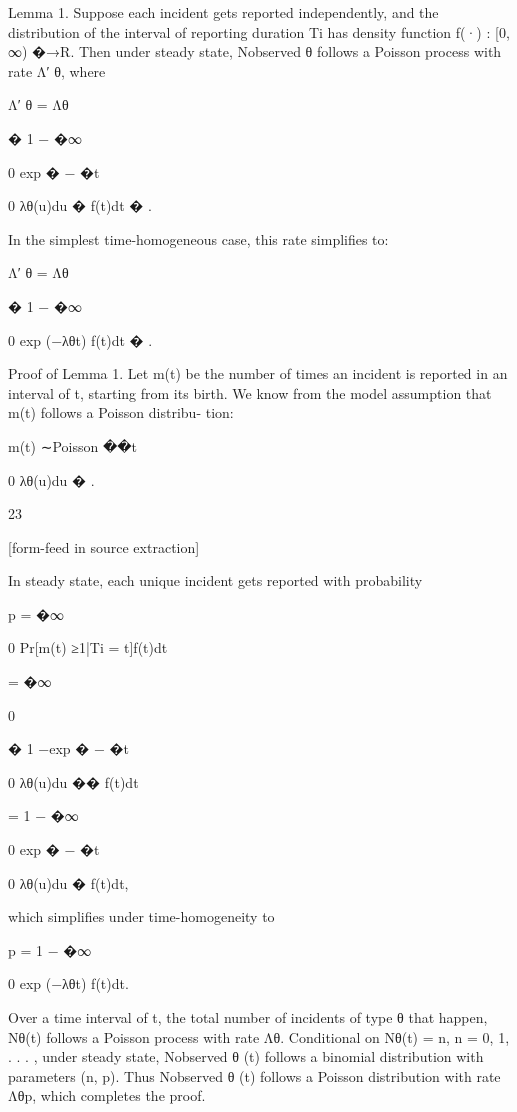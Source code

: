 \documentclass[10pt]{article}
\begin{document}
\begin{ReviewVerbatim}
Lemma 1. Suppose each incident gets reported independently, and the distribution of the interval
of reporting duration Ti has density function f(·) : [0, ∞) �→R. Then under steady state, Nobserved
θ
follows a Poisson process with rate Λ′
θ, where

Λ′
θ = Λθ

�
1 −
�∞

0
exp
�
−
�t

0
λθ(u)du
�
f(t)dt
�
.

In the simplest time-homogeneous case, this rate simplifies to:

Λ′
θ = Λθ

�
1 −
�∞

0
exp (−λθt) f(t)dt
�
.

Proof of Lemma 1. Let m(t) be the number of times an incident is reported in an interval of t,
starting from its birth. We know from the model assumption that m(t) follows a Poisson distribu-
tion:

m(t) ∼Poisson
��t

0
λθ(u)du
�
.

23


[form-feed in source extraction]

In steady state, each unique incident gets reported with probability

p =
�∞

0
Pr[m(t) ≥1|Ti = t]f(t)dt

=
�∞

0

�
1 −exp
�
−
�t

0
λθ(u)du
��
f(t)dt

= 1 −
�∞

0
exp
�
−
�t

0
λθ(u)du
�
f(t)dt,

which simplifies under time-homogeneity to

p = 1 −
�∞

0
exp (−λθt) f(t)dt.

Over a time interval of t, the total number of incidents of type θ that happen, Nθ(t) follows
a Poisson process with rate Λθ.
Conditional on Nθ(t) = n, n = 0, 1, . . . , under steady state,
Nobserved
θ
(t) follows a binomial distribution with parameters (n, p).
Thus Nobserved
θ
(t) follows a
Poisson distribution with rate Λθp, which completes the proof.
\end{ReviewVerbatim}

\end{document}
